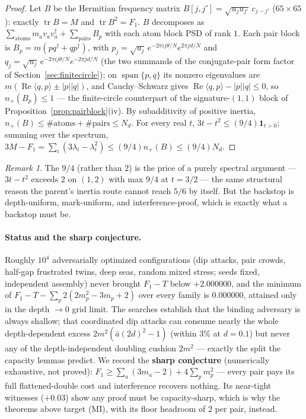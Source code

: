 \documentclass[11pt]{article}
\theoremstyle{plain}
\theoremstyle{definition}
\theoremstyle{remark}
\newtheorem*{remk}{Remark}
\newcommand{\tr}{\operatorname{tr}}
\newcommand{\Nd}{N_{d}}
\newcommand{\one}{\mathbf{1}}
\begin{document}
\begin{proof}
Let $B$ be the Hermitian frequency matrix
$B[j, j'] = \sqrt{u_j u_{j'}}\, c_{j - j'}$ ($65 \times 65$): exactly
$\tr B = M$ and $\tr B^2 = F_1$. $B$ decomposes as
$\sum_{\mathrm{atoms}} m_a v_a v_a^{\dagger} + \sum_{\mathrm{pairs}} B_p$ with
each atom block PSD of rank $1$. Each pair block is
$B_p = m(p q^{\dagger} + q p^{\dagger})$, with
$p_j = \sqrt{u_j}\, e^{-2\pi i j \theta/N} e^{2\pi j d/N}$ and
$q_j = \sqrt{u_j}\, e^{-2\pi i j \theta/N} e^{-2\pi j d/N}$ (the two summands of
the conjugate-pair form factor of Section~\ref{sec:finitecircle}); on
$\operatorname{span}\{p, q\}$ its nonzero eigenvalues are
$m(\operatorname{Re}\langle q, p\rangle \pm |p||q|)$, and Cauchy--Schwarz gives
$\operatorname{Re}\langle q, p\rangle - |p||q| \le 0$, so $n_+(B_p) \le 1$ ---
the finite-circle counterpart of the signature-$(1,1)$ block of
Proposition~\ref{prop:pairblock}(iv). By subadditivity of positive inertia,
$n_+(B) \le \#\mathrm{atoms} + \#\mathrm{pairs} \le \Nd$. For every real $t$,
$3t - t^2 \le (9/4)\one_{t > 0}$; summing over the spectrum,
$3M - F_1 = \sum_i (3\lambda_i - \lambda_i^2) \le (9/4) n_+(B) \le (9/4)\Nd$.
\end{proof}

\begin{remk}
The $9/4$ (rather than $2$) is the price of a purely spectral argument ---
$3t - t^2$ exceeds $2$ on $(1, 2)$ with max $9/4$ at $t = 3/2$ --- the same
structural reason the parent's inertia route cannot reach $5/6$ by itself. But
the backstop is depth-uniform, mark-uniform, and interference-proof, which is
exactly what a backstop must be.
\end{remk}

\paragraph{Status and the sharp conjecture.}
Roughly $10^4$ adversarially optimized configurations (dip attacks, pair crowds,
half-gap frustrated twins, deep seas, random mixed stress; seeds fixed,
independent assembly) never brought $F_1 - T$ below $+2.000000$, and the minimum
of $F_1 - T - \sum_p 2(2 m_p^2 - 3 m_p + 2)$ over every family is $0.000000$,
attained only in the depth $\to 0$ grid limit. The searches establish that the
binding adversary is always shallow; that coordinated dip attacks can consume
nearly the whole depth-dependent excess $2m^2(\bar{a}(2d)^2 - 1)$ (within $3\%$
at $d = 0.1$) but never any of the depth-independent doubling cushion $2m^2$ ---
exactly the split the capacity lemmas predict. We record the \textbf{sharp
conjecture} (numerically exhaustive, not proved):
$F_1 \ge \sum_a (3 m_a - 2) + 4\sum_p m_p^2$ --- every pair pays its full
flattened-double cost and interference recovers nothing. Its near-tight witnesses
($+0.03$) show any proof must be capacity-sharp, which is why the theorems above
target (MI), with its floor headroom of $2$ per pair, instead.
\end{document}
